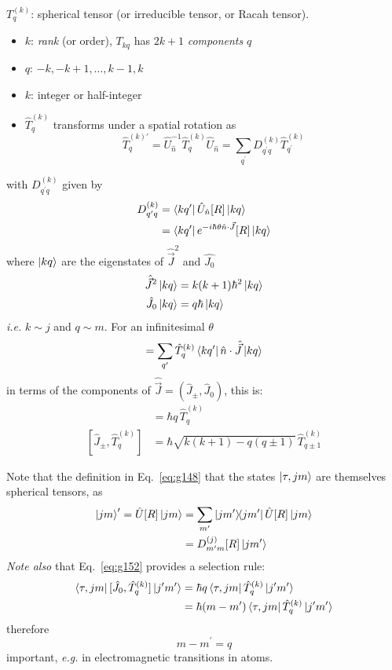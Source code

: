 \documentclass[12pt]{article}
\newcommand{\be}{\begin{equation}}
\newcommand{\ee}{\end{equation}}
\begin{document}
$T_q^{(k)}$: spherical tensor (or irreducible tensor, or Racah tensor).
\begin{itemize}
\item $k$: \emph{rank} (or order), $T_{kq}$ has $2k+1$ \emph{components} $q$
\item $q$: $-k, -k+1, \ldots, k-1, k$
\item $k$: integer or half-integer
\item $\hat{T}_q^{(k)}$ transforms under a spatial rotation as
\be
\hat{T}_q^{(k)\prime} = \hat{U}_{\hat{n}}^{-1} \hat{T}_q^{(k)} \hat{U}_{\hat{n}} = \sum_{q^\prime} D_{q^\prime q}^{(k)} \hat{T}_{q^\prime}^{(k)}
\label{eq:g148}
\ee
\end{itemize}
with $D_{q^\prime q}^{(k)}$ given by
\[
\begin{aligned}
D_{q^\prime q}^{(k)}
&= \bra{kq^\prime}\hat{U}_{\hat{n}}[R]\ket{kq}\\
&= \bra{kq^\prime}e^{-i\hbar\theta\hat{n}\cdot\vec{J}}[R]\ket{kq}\\
\end{aligned}
\]
where $\ket{kq}$ are the eigenstates of $\hat{\vec{J}}^2$ and $\hat{J_0}$
\begin{align}
\hat{\vec{J}}^2 \ket{kq} &= k(k+1) \hbar^2 \ket{kq}\\
\hat{J_0} \ket{kq} &= q\hbar \ket{kq}
\end{align}
\textit{i.e.} $k \sim j $ and $q \sim m$. 
For an infinitesimal $\theta$
\be
[\hat{n}\cdot\hat{\vec{J}}, \hat{T}_q^{(k)}]
= \sum_{q^\prime} \hat{T}_q^{(k)}
\bra{kq^\prime}\hat{n}\cdot\hat{\vec{J}}\ket{kq}
\ee
in terms of the components of $\hat{\vec{J}} = (\hat{J}_\pm, \hat{J}_0)$, this is:
\begin{align}
[\hat{J}_0, \hat{T}_q^{(k)}]   &= \hbar q\,\hat{T}_q^{(k)}\\
[\hat{J}_\pm, \hat{T}_q^{(k)}] &= \hbar \sqrt{k(k+1)-q(q \pm 1)}\,\hat{T}_{q\pm1}^{(k)}\label{eq:g152}
\end{align}


Note that the definition in Eq.~\eqref{eq:g148} that the states $\ket{\tau,jm}$ are themselves spherical tensors, as
\be
\begin{aligned}
\ket{jm}^\prime = \hat{U}[R]\ket{jm}
&=\sum_{m^\prime}\op{jm^\prime}\hat{U}[R]\ket{jm}\\
&=D_{m^{\prime}m}^{(j)}[R]\ket{jm^\prime}
\end{aligned}
\ee
\emph{Note also} that Eq.~\eqref{eq:g152} provides a selection rule:
\[
\begin{aligned}
\bra{\tau,jm}[\hat{J}_0, \hat{T}_q^{(k)}]\ket{j^\prime m^\prime}
&=\hbar q \bra{\tau,jm}\hat{T}_q^{(k)}\ket{j^\prime m^\prime}\\
&= \hbar(m-m^\prime)\bra{\tau,jm}\hat{T}_q^{(k)}\ket{j^\prime m^\prime}
\end{aligned}
\]
therefore
\be
m-m^\prime=q
\ee
important, \textit{e.g.} in electromagnetic transitions in atoms.
\end{document}
